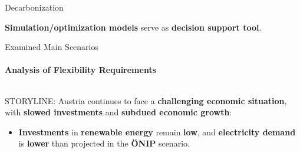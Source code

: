 \documentclass[aspectratio=169]{beamer}
\begin{document}
\begin{frame}{Decarbonization}
    \begin{coloredblock}[yellow][][][c][1.5cm]
        \centering \textbf{Simulation/optimization models} serve as \textbf{decision support tool}.
    \end{coloredblock}


\end{frame}

\begin{frame}{Examined Main Scenarios}
    \framesubtitle{Analysis of Flexibility Requirements}

    \vspace{-.9cm}
    \begin{columns}
        \begin{column}{0.32\textwidth}
            \begin{coloredblock}
                \begin{minipage}[t][5cm]{0.9\textwidth} 
                    \scriptsize STORYLINE: Austria continues to face a \textbf{challenging economic situation}, with \textbf{slowed investments} and \textbf{subdued economic growth}:
                \end{minipage}
                \begin{minipage}[t][4.2cm]{0.9\textwidth}
                    \begin{itemize}
                        \item \scriptsize \textbf{Investments} in \textbf{renewable energy} remain \textbf{low}, and \textbf{electricity demand} is \textbf{lower} than projected in the \textbf{ÖNIP} scenario.


\end{itemize}
\end{minipage}
\end{coloredblock}
\end{column}
\end{columns}
\end{frame}
\end{document}
